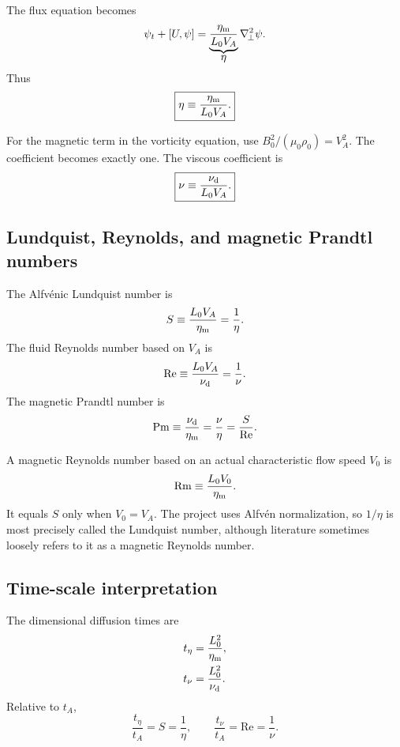 \documentclass[11pt]{article}
\newcommand{\bracket}[2]{\left[#1,#2\right]}
\newcommand{\Lap}{\nabla_{\!\perp}^{2}}
\begin{document}
The flux equation becomes
\begin{equation}
\psi_t+\bracket{U}{\psi}
=\underbrace{\frac{\eta_{\rm m}}{L_0V_A}}_{\displaystyle\eta}\Lap\psi.
\end{equation}
Thus
\begin{equation}
\boxed{\eta\equiv\frac{\eta_{\rm m}}{L_0V_A}.}
\label{eq:eta_nondim}
\end{equation}

For the magnetic term in the vorticity equation, use $B_0^2/(\mu_0\rho_0)=V_A^2$. The coefficient becomes exactly one. The viscous coefficient is
\begin{equation}
\boxed{\nu\equiv\frac{\nu_{\rm d}}{L_0V_A}.}
\label{eq:nu_nondim}
\end{equation}

\subsection{Lundquist, Reynolds, and magnetic Prandtl numbers}

The Alfv\'enic Lundquist number is
\begin{equation}
S\equiv\frac{L_0V_A}{\eta_{\rm m}}=\frac{1}{\eta}.
\label{eq:lundquist}
\end{equation}
The fluid Reynolds number based on $V_A$ is
\begin{equation}
\mathrm{Re}\equiv\frac{L_0V_A}{\nu_{\rm d}}=\frac{1}{\nu}.
\label{eq:reynolds}
\end{equation}
The magnetic Prandtl number is
\begin{equation}
\mathrm{Pm}\equiv\frac{\nu_{\rm d}}{\eta_{\rm m}}
=\frac{\nu}{\eta}=\frac{S}{\mathrm{Re}}.
\label{eq:pm}
\end{equation}

A magnetic Reynolds number based on an actual characteristic flow speed $V_0$ is
\begin{equation}
\mathrm{Rm}\equiv\frac{L_0V_0}{\eta_{\rm m}}.
\end{equation}
It equals $S$ only when $V_0=V_A$. The project uses Alfv\'en normalization, so $1/\eta$ is most precisely called the Lundquist number, although literature sometimes loosely refers to it as a magnetic Reynolds number.

\subsection{Time-scale interpretation}

The dimensional diffusion times are
\begin{align}
t_\eta&=\frac{L_0^2}{\eta_{\rm m}},\\
t_\nu&=\frac{L_0^2}{\nu_{\rm d}}.
\end{align}
Relative to $t_A$,
\begin{equation}
\frac{t_\eta}{t_A}=S=\frac{1}{\eta},
\qquad
\frac{t_\nu}{t_A}=\mathrm{Re}=\frac{1}{\nu}.
\end{equation}
\end{document}
